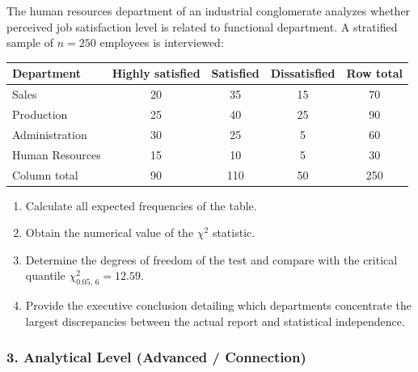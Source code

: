 \begin{problema}
	\label{prob:f622374}
	The human resources department of an industrial conglomerate analyzes whether perceived job satisfaction level is related to functional department. A stratified sample of $n = 250$ employees is interviewed:
	\begin{center}
		\begin{tabular}{|l|c|c|c|c|}\hline
			Department & Highly satisfied & Satisfied & Dissatisfied & Row total \\\hline
			Sales & 20 & 35 & 15 & 70 \\\hline
			Production & 25 & 40 & 25 & 90 \\\hline
			Administration & 30 & 25 & 5 & 60 \\\hline
			Human Resources & 15 & 10 & 5 & 30 \\\hline
			Column total & 90 & 110 & 50 & 250 \\\hline
		\end{tabular}
	\end{center}
	\begin{enumerate}
		\item Calculate all expected frequencies of the table.
		\item Obtain the numerical value of the $\chi^2$ statistic.
		\item Determine the degrees of freedom of the test and compare with the critical quantile $\chi^2_{0.05, \, 6} = 12.59$.
		\item Provide the executive conclusion detailing which departments concentrate the largest discrepancies between the actual report and statistical independence.
	\end{enumerate}
\end{problema}

\subsubsection*{3. Analytical Level (Advanced / Connection)}

